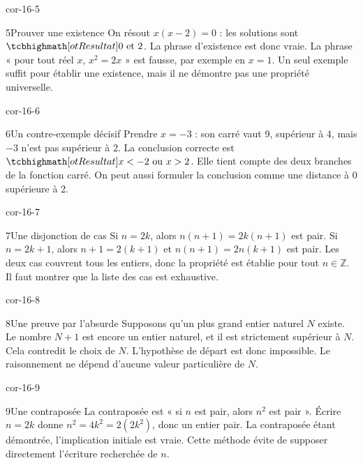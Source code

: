 \begin{blocLivre}{cor-16-5}
\begin{corrige}{5}{Prouver une existence}
On résout $x(x-2)=0$ : les solutions sont $\res{0\text{ et }2}$. La phrase d’existence est donc vraie. La phrase « pour tout réel $x$, $x^2=2x$ » est fausse, par exemple en $x=1$. Un seul exemple suffit pour établir une existence, mais il ne démontre pas une propriété universelle.
\end{corrige}
\end{blocLivre}
\begin{blocLivre}{cor-16-6}
\begin{corrige}{6}{Un contre-exemple décisif}
Prendre $x=-3$ : son carré vaut 9, supérieur à 4, mais $-3$ n’est pas supérieur à 2. La conclusion correcte est $\res{x<-2\text{ ou }x>2}$. Elle tient compte des deux branches de la fonction carré. On peut aussi formuler la conclusion comme une distance à 0 supérieure à 2.
\end{corrige}
\end{blocLivre}
\begin{blocLivre}{cor-16-7}
\begin{corrige}{7}{Une disjonction de cas}
Si $n=2k$, alors $n(n+1)=2k(n+1)$ est pair. Si $n=2k+1$, alors $n+1=2(k+1)$ et $n(n+1)=2n(k+1)$ est pair. Les deux cas couvrent tous les entiers, donc la propriété est établie pour tout $n\in\mathbb Z$. Il faut montrer que la liste des cas est exhaustive.
\end{corrige}
\end{blocLivre}
\begin{blocLivre}{cor-16-8}
\begin{corrige}{8}{Une preuve par l’absurde}
Supposons qu’un plus grand entier naturel $N$ existe. Le nombre $N+1$ est encore un entier naturel, et il est strictement supérieur à $N$. Cela contredit le choix de $N$. L’hypothèse de départ est donc impossible. Le raisonnement ne dépend d’aucune valeur particulière de $N$.
\end{corrige}
\end{blocLivre}
\begin{blocLivre}{cor-16-9}
\begin{corrige}{9}{Une contraposée}
La contraposée est « si $n$ est pair, alors $n^2$ est pair ». Écrire $n=2k$ donne $n^2=4k^2=2(2k^2)$, donc un entier pair. La contraposée étant démontrée, l’implication initiale est vraie. Cette méthode évite de supposer directement l’écriture recherchée de $n$.
\end{corrige}
\end{blocLivre}
